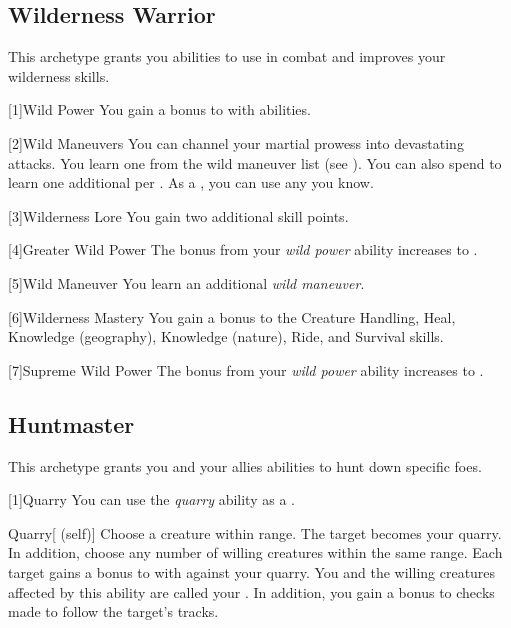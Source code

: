     \subsection{Wilderness Warrior}
        This archetype grants you abilities to use in combat and improves your wilderness skills.

        [1]{Wild Power} You gain a  bonus to  with  abilities.

        [2]{Wild Maneuvers} 
        You can channel your martial prowess into devastating attacks.
        You learn one  from the wild maneuver list (see ).
        You can also spend  to learn one additional  per .
        As a , you can use any  you know.

        [3]{Wilderness Lore} You gain two additional skill points.

        [4]{Greater Wild Power} The bonus from your \textit{wild power} ability increases to .

        [5]{Wild Maneuver}
        You learn an additional \textit{wild maneuver}.

        [6]{Wilderness Mastery} You gain a  bonus to the Creature Handling, Heal, Knowledge (geography), Knowledge (nature), Ride, and Survival skills.

        [7]{Supreme Wild Power} The bonus from your \textit{wild power} ability increases to .

    \subsection{Huntmaster}
        This archetype grants you and your allies abilities to hunt down specific foes.

        [1]{Quarry}\label{Quarry} You can use the \textit{quarry} ability as a .
        \begin{attuneability}{Quarry}[ (self)]
            Choose a creature within \rnglong range.
            The target becomes your quarry.
            In addition, choose any number of willing creatures within the same range.
            Each target gains a  bonus to  with  against your quarry.
            You and the willing creatures affected by this ability are called your .
            In addition, you gain a  bonus to checks made to follow the target's tracks.
        \end{attuneability}

